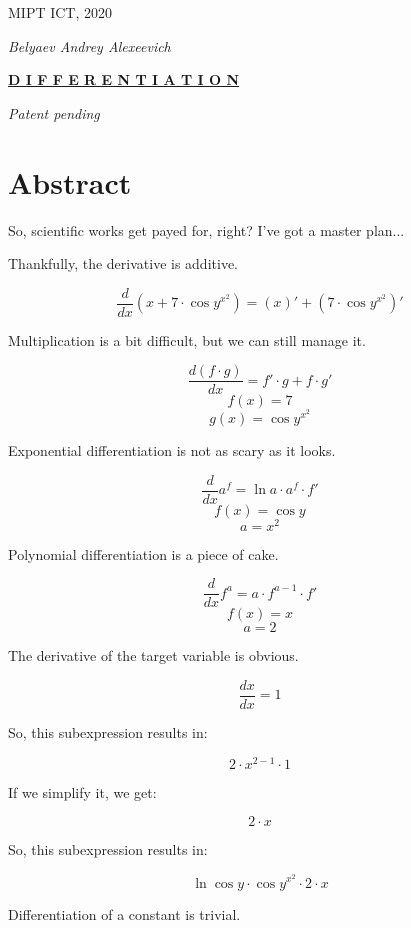 \documentclass[12pt]{article}
\begin{document}
\begin{titlepage}\begin{center}\Large MIPT ICT, 2020\end{center}\begin{center}\Large\textit{Belyaev Andrey Alexeevich}\end{center}\begin{center}\Huge\textbf{\underline{D I F F E R E N T I A T I O N}}\end{center}\begin{center}\large\textit{Patent pending}\end{center}\section{\Large{Abstract}}So, scientific works get payed for, right? I've got a master plan...\end{titlepage}

Thankfully, the derivative is additive.

$$ \frac{d}{dx} \left( x  +  7  \cdot \cos  y ^{ x ^{ 2 }}\right) = \left( x \right)' + \left( 7  \cdot \cos  y ^{ x ^{ 2 }}\right)' $$

Multiplication is a bit difficult, but we can still manage it.

$$ \frac{d (f \cdot g)}{dx} = f' \cdot g + f \cdot g' $$
$$ f(x) =  7  $$
 $$ g(x) = \cos  y ^{ x ^{ 2 }} $$

Exponential differentiation is not as scary as it looks.

$$ \frac{d}{dx} a^f = \ln{a} \cdot a^f \cdot f' $$
$$ f(x) = \cos  y  $$
 $$ a =  x ^{ 2 } $$

Polynomial differentiation is a piece of cake.

$$ \frac{d}{dx} f^{a} = a \cdot f^{a - 1} \cdot f' $$
$$ f(x) =  x  $$
 $$ a =  2  $$

The derivative of the target variable is obvious.

$$ \frac{dx}{dx} = 1 $$

So, this subexpression results in:

$$  2  \cdot  x ^{ 2  -  1 } \cdot  1  $$

If we simplify it, we get:

$$  2  \cdot  x  $$

So, this subexpression results in:

$$ \ln \cos  y  \cdot \cos  y ^{ x ^{ 2 }} \cdot  2  \cdot  x  $$

Differentiation of a constant is trivial.
\end{document}
